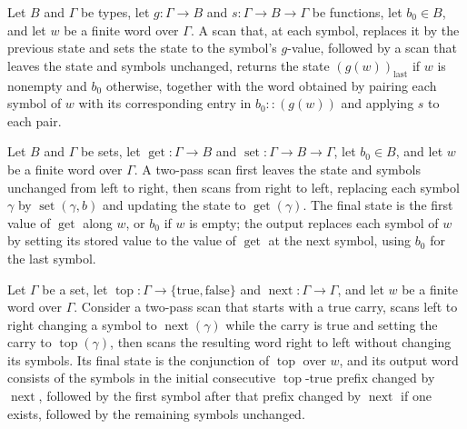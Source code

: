\begin{theorem}
\label{Turing.scanResult_shiftRight}
\leanok
{}
Let $B$ and $\Gamma$ be types, let $g:\Gamma\to B$ and $s:\Gamma\to B\to\Gamma$ be
functions, let $b_0\in B$, and let $w$ be a finite word over $\Gamma$. A scan that, at
each symbol, replaces it by the previous state and sets the state to the symbol’s
$g$-value, followed by a scan that leaves the state and symbols unchanged, returns the
state $(g(w))_{\mathrm{last}}$ if $w$ is nonempty and $b_0$ otherwise, together with the
word obtained by pairing each symbol of $w$ with its corresponding entry in
$b_0::(g(w))$ and applying $s$ to each pair.
\end{theorem}

\begin{theorem}
\label{Turing.scanResult_shiftLeft}
\leanok
{}
Let $B$ and $\Gamma$ be sets, let $\operatorname{get}:\Gamma\to B$ and
$\operatorname{set}:\Gamma\to B\to\Gamma$, let $b_0\in B$, and let $w$ be a finite word
over $\Gamma$. A two-pass scan first leaves the state and symbols unchanged from left to
right, then scans from right to left, replacing each symbol $\gamma$ by
$\operatorname{set}(\gamma,b)$ and updating the state to $\operatorname{get}(\gamma)$.
The final state is the first value of $\operatorname{get}$ along $w$, or $b_0$ if $w$ is
empty; the output replaces each symbol of $w$ by setting its stored value to the value
of $\operatorname{get}$ at the next symbol, using $b_0$ for the last symbol.
\end{theorem}

\begin{theorem}
\label{Turing.scanResult_carry}
\leanok
{}
Let $\Gamma$ be a set, let
$\operatorname{top}:\Gamma\to\{\mathrm{true},\mathrm{false}\}$ and
$\operatorname{next}:\Gamma\to\Gamma$, and let $w$ be a finite word over $\Gamma$.
Consider a two-pass scan that starts with a true carry, scans left to right changing a
symbol to $\operatorname{next}(\gamma)$ while the carry is true and setting the carry to
$\operatorname{top}(\gamma)$, then scans the resulting word right to left without
changing its symbols. Its final state is the conjunction of $\operatorname{top}$ over
$w$, and its output word consists of the symbols in the initial consecutive
$\operatorname{top}$-true prefix changed by $\operatorname{next}$, followed by the first
symbol after that prefix changed by $\operatorname{next}$ if one exists, followed by the
remaining symbols unchanged.
\end{theorem}


